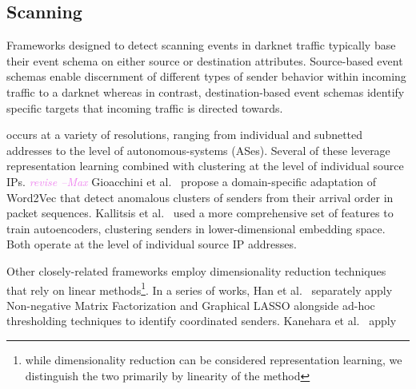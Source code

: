 \documentclass[manuscript,nonacm]{acmart}
\newcommand{\maxnote}[1]{\textit{\textcolor{violet}{#1 --Max}}}
\begin{document}

\subsection{Scanning}

Frameworks designed to detect scanning events in darknet traffic typically base their event schema on either source or destination attributes.
Source-based event schemas enable discernment of different types of sender behavior within incoming traffic to a darknet whereas in contrast, 
destination-based event schemas identify specific targets that incoming traffic is directed towards.

 occurs at a variety of resolutions, ranging from individual and subnetted addresses to the level of autonomous-systems (ASes).
Several of these leverage representation learning combined with clustering at the level of individual source IPs. \maxnote{revise}
Gioacchini et al.~\cite{@@} propose a domain-specific adaptation of Word2Vec that detect anomalous clusters of senders from their arrival order in packet sequences. 
Kallitsis et al.~\cite{@@} used a more comprehensive set of features to train autoencoders, clustering senders in lower-dimensional embedding space.
Both operate at the level of individual source IP addresses. 

Other closely-related frameworks employ dimensionality reduction techniques that rely on linear methods\footnote{while dimensionality reduction can be considered representation learning, we distinguish the two primarily by linearity of the method}.
In a series of works, Han et al.~\cite{@@} separately apply Non-negative Matrix Factorization and Graphical LASSO alongside ad-hoc thresholding techniques to identify coordinated senders.
Kanehara et al.~\cite{@@} apply 



\end{document}
